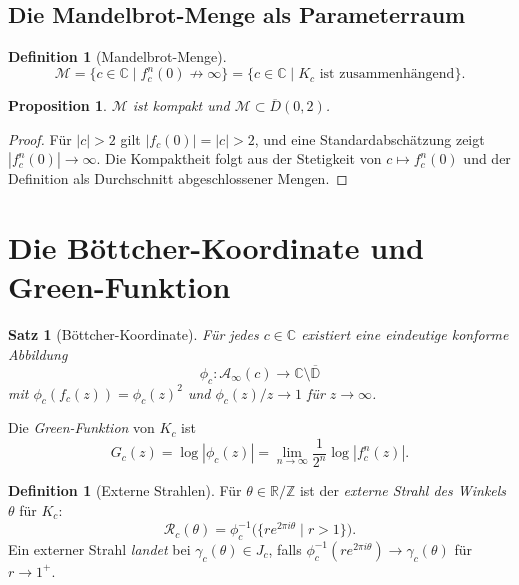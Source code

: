 \documentclass[12pt,a4paper]{amsart}
\newtheorem{proposition}[theorem]{Proposition}
\newtheorem{satz}[theorem]{Satz}
\theoremstyle{definition}
\newtheorem{definition_de}[theorem]{Definition}
\theoremstyle{remark}
\begin{document}
\subsection{Die Mandelbrot-Menge als Parameterraum}

\begin{definition_de}[Mandelbrot-Menge]
\[
    \mathcal{M} = \{ c \in \mathbb{C} \mid f_c^n(0) \not\to \infty \}
              = \{ c \in \mathbb{C} \mid K_c \text{ ist zusammenhängend} \}.
\]
\end{definition_de}

\begin{proposition}
$\mathcal{M}$ ist kompakt und $\mathcal{M} \subset \overline{D}(0, 2)$.
\end{proposition}

\begin{proof}
Für $|c| > 2$ gilt $|f_c(0)| = |c| > 2$, und eine Standardabschätzung
zeigt $|f_c^n(0)| \to \infty$. Die Kompaktheit folgt aus der Stetigkeit
von $c \mapsto f_c^n(0)$ und der Definition als Durchschnitt abgeschlossener
Mengen.
\end{proof}

\section{Die Böttcher-Koordinate und Green-Funktion}

\begin{satz}[Böttcher-Koordinate]
Für jedes $c \in \mathbb{C}$ existiert eine eindeutige konforme Abbildung
\[
    \phi_c \colon \mathcal{A}_\infty(c) \to \mathbb{C} \setminus \overline{\mathbb{D}}
\]
mit $\phi_c(f_c(z)) = \phi_c(z)^2$ und $\phi_c(z)/z \to 1$ für $z \to \infty$.
\end{satz}

Die \emph{Green-Funktion} von $K_c$ ist
\[
    G_c(z) = \log|\phi_c(z)| = \lim_{n\to\infty} \frac{1}{2^n} \log|f_c^n(z)|.
\]

\begin{definition_de}[Externe Strahlen]
Für $\theta \in \mathbb{R}/\mathbb{Z}$ ist der \emph{externe Strahl des Winkels
$\theta$} für $K_c$:
\[
    \mathcal{R}_c(\theta) = \phi_c^{-1}\bigl(\{ r e^{2\pi i \theta} \mid r > 1 \}\bigr).
\]
Ein externer Strahl \emph{landet} bei $\gamma_c(\theta) \in J_c$, falls
$\phi_c^{-1}(r e^{2\pi i \theta}) \to \gamma_c(\theta)$ für $r \to 1^+$.
\end{definition_de}
\end{document}
